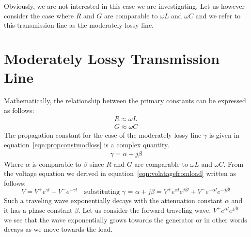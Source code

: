Obviously, we are not interested in this case we are investigating. Let us however consider the case where $R$ and $G$ are comparable to $\omega L$ and $\omega C$ and we refer to this transmission line as the moderately lossy line.

\section{Moderately Lossy Transmission Line}Mathematically, the relationship between the primary constants can be expressed as follows:
\begin{align*}
R \approx \omega L\\
G \approx \omega C
\end{align*}
The propagation constant for the case of the moderately lossy line $\gamma$ is given in equation~\eqref{eqn:propconstmodloss} is a complex quantity.
\begin{align}
\gamma = \alpha +j\beta
\label{eqn:propconstmodloss}
\end{align}
Where $\alpha$ is comparable to $\beta$ since $R$ and $G$ are comparable to $\omega L$ and $\omega C$. From the voltage equation we derived in equation~\eqref{eqn:volatagefromload} written as follows:
\begin{dmath*}
V = V^+e^{\gamma l} + V^-e^{
-\gamma l}\quad\text{substituting }\gamma\text{ = }\alpha + j\beta
= V^+e^{\alpha l}e^{j\beta l} + V^-e^{-\alpha l}e^{-j\beta l}
\end{dmath*}
Such a traveling wave exponentially decays with the attenuation constant $\alpha$ and it has a phase constant $\beta$. Let us consider the forward traveling wave, $V^+e^{\alpha l}e^{j\beta l}$ we see that the wave exponentially grows towards the generator or in other words decays as we move towards the load.

